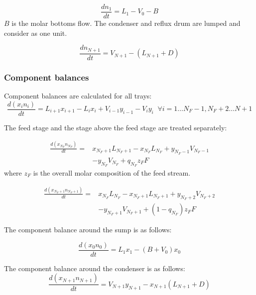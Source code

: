 \begin{equation}
    \frac{dn_1}{dt} =  L_1 - V_0 - B
\end{equation}
$B$ is the molar bottoms flow. The condenser and reflux drum are lumped and consider as one unit.

\begin{equation}
    \frac{dn_{N+1}}{dt} = V_{N+1}-(L_{N+1} + D)    
\end{equation}


\subsubsection{Component balances}

Component balances are calculated for all trays:
\begin{equation}
   \frac{d(x_{i} n_{i})}{dt}= L_{i+1} x_{i+1} - L_i x_{i} + V_{i-1} y_{i-1} -V_i y_i  \;\; \forall i=1 \dots N_F-1, N_F+2 \dots N+1
\end{equation}

\noindent The feed stage and the stage above the feed stage are treated separately:

\begin{equation}
\begin{split}
 \frac{d(x_{N_F} n_{N_F})}{dt} =  &  x_{N_F+1}L_{N_F+1}  - x_{N_F}L_{N_F} +  y_{N_F-1}V_{N_F-1} \\ & -y_{N_F}V_{N_F} + q_{N_F}z_FF   
\end{split}
\end{equation}
where $z_F$ is the overall molar composition of the feed stream.

\begin{equation}
\begin{split}
    \frac{d(x_{N_F+1} n_{N_F+1})}{dt} =  & x_{N_F}L_{N_F} - x_{N_F+1}L_{N_F+1} +  y_{N_F+2}V_{N_F+2}   \\ & -y_{N_F+1}V_{N_F+1}  + (1-q_{N_F})z_FF 
\end{split}
\end{equation}

\noindent The component balance around the sump is as follows:

\begin{equation}
    \frac{d(x_{0} n_{0})}{dt} = L_1 x_1 - (B + V_0) x_0 
\end{equation}

\noindent The component balance around the condenser is as follows:
\begin{equation}
    \frac{d(x_{N+1} n_{N+1})}{dt}  = V_{N+1} y_{N+1} - x_{N+1} (L_{N+1} + D)
\end{equation}


